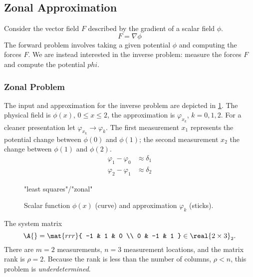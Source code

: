 \subsection{Zonal Approximation}  %
Consider the vector field $F$ described by the gradient of a scalar field $\phi$.
  \begin{equation*}   %
    F = \nabla \phi
  \end{equation*}
The forward problem involves taking a given potential $\phi$ and computing the forces $F$. We are instead interested in the inverse problem: measure the forces $F$ and compute the potential $phi$.

\subsubsection{\label{ssec:zonal solution}Zonal Problem}  %
The input and approximation for the inverse problem are depicted in \ref{fig:sticks}. The physical field is $\phi(x)$, $0\le x \le 2$, the approximation is $\varphi_{x_{k}}$, $k=0,1,2$. For a cleaner presentation let $\varphi_{x_{k}} \rightarrow \varphi_{k}$. The first measurement $x_{1}$ represents the potential change between $\phi(0)$ and $\phi(1)$; the second measurement $x_{2}$ the change between $\phi(1)$ and $\phi(2)$.
  \begin{equation*}   %
    \begin{split}
      \varphi_{1} - \varphi_{0} &\approx \delta_{1} \\
      \varphi_{2} - \varphi_{1} &\approx \delta_{2}
    \end{split}
  \end{equation*}

\begin{figure}[htbp] %
   \centering
   \begin{overpic}[ scale = \myscale ]
	   {\pathgraphics "least squares"/"zonal"}
   \end{overpic}
   \caption[Scalar function $\phi$ and approximations.]{Scalar function $\phi(x)$ (curve) and approximation $\varphi_{k}$ (sticks).}
   \label{fig:sticks}
\end{figure}

The system matrix 
  \begin{equation*}   %
      \A{} =     \mat{rrr}{ 
      -1 & 1 & 0 \\
       0 & -1 & 1 } \in \real{2 \times 3}_{2}.
  \end{equation*}
There are $m = 2$ measurements, $n = 3$ measurement locations, and the matrix rank is $\rho = 2$. Because the rank is less than the number of columns, $\rho < n$, this problem is \emph{underdetermined}.

